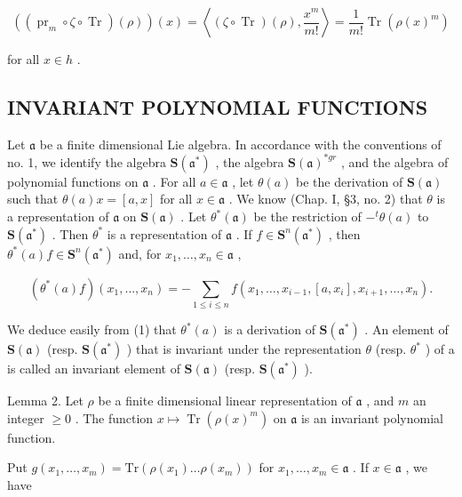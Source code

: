 \[
((\operatorname{pr} _ {m} \circ \zeta \circ \operatorname{Tr}) (\rho)) (x) = \left\langle (\zeta \circ \operatorname{Tr}) (\rho), \frac {x ^ {m}}{m !} \right\rangle = \frac {1}{m !} \operatorname{Tr} (\rho (x) ^ {m})
\]

for all \(x \in h\) .

\subsection{INVARIANT POLYNOMIAL FUNCTIONS}

Let \(\mathfrak{a}\) be a finite dimensional Lie algebra. In accordance with the conventions of no. 1, we identify the algebra \(\mathbf{S}(\mathfrak{a}^{*})\) , the algebra \(\mathbf{S}(\mathfrak{a})^{*gr}\) , and the algebra of polynomial functions on \(\mathfrak{a}\) . For all \(a \in \mathfrak{a}\) , let \(\theta(a)\) be the derivation of \(\mathbf{S}(\mathfrak{a})\) such that \(\theta(a)x = [a, x]\) for all \(x \in \mathfrak{a}\) . We know (Chap. I, §3, no. 2) that \(\theta\) is a representation of \(\mathfrak{a}\) on \(\mathbf{S}(\mathfrak{a})\) . Let \(\theta^{*}(\mathfrak{a})\) be the restriction of \(-^{t}\theta(a)\) to \(\mathbf{S}(\mathfrak{a}^{*})\) . Then \(\theta^{*}\) is a representation of \(\mathfrak{a}\) . If \(f \in \mathbf{S}^{n}(\mathfrak{a}^{*})\) , then \(\theta^{*}(a)f \in \mathbf{S}^{n}(\mathfrak{a}^{*})\) and, for \(x_{1}, \ldots, x_{n} \in \mathfrak{a}\) ,

\[
(\theta^ {*} (a) f) (x _ {1}, \dots , x _ {n}) = - \sum_ {1 \leq i \leq n} f (x _ {1}, \dots , x _ {i - 1}, [ a, x _ {i} ], x _ {i + 1}, \dots , x _ {n}).\tag{1}
\]

We deduce easily from (1) that \(\theta^{*}(a)\) is a derivation of \(\mathbf{S}(\mathfrak{a}^{*})\) . An element of \(\mathbf{S}(\mathfrak{a})\) (resp. \(\mathbf{S}(\mathfrak{a}^{*})\) ) that is invariant under the representation \(\theta\) (resp. \(\theta^{*}\) ) of a is called an invariant element of \(\mathbf{S}(\mathfrak{a})\) (resp. \(\mathbf{S}(\mathfrak{a}^{*})\) ).

Lemma 2. Let \(\rho\) be a finite dimensional linear representation of \(\mathfrak{a}\) , and \(m\) an integer \(\geq 0\) . The function \(x \mapsto \operatorname{Tr}(\rho(x)^m)\) on \(\mathfrak{a}\) is an invariant polynomial function.

Put \(g(x_{1},\ldots ,x_{m}) = \mathrm{Tr}(\rho (x_{1})\ldots \rho (x_{m}))\) for \(x_{1},\ldots ,x_{m}\in \mathfrak{a}\) . If \(x\in \mathfrak{a}\) , we have

